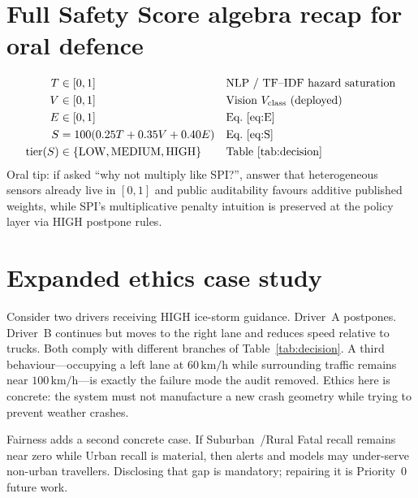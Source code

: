 \documentclass[11pt,a4paper]{article}
\begin{document}
\newpage
\section*{Full Safety Score algebra recap for oral defence}
\begin{align}
T &\in[0,1] && \text{NLP / TF--IDF hazard saturation}\\
V &\in[0,1] && \text{Vision $V_{\mathrm{class}}$ (deployed)}\\
E &\in[0,1] && \text{Eq.~\eqref{eq:E}}\\
S &=100(0.25T+0.35V+0.40E) && \text{Eq.~\eqref{eq:S}}\\
\mathrm{tier}(S) &\in\{\mathrm{LOW},\mathrm{MEDIUM},\mathrm{HIGH}\} && \text{Table~\ref{tab:decision}}
\end{align}
Oral tip: if asked ``why not multiply like SPI?'', answer that heterogeneous sensors already live in $[0,1]$ and public auditability favours additive published weights, while SPI's multiplicative penalty intuition is preserved at the policy layer via HIGH postpone rules.

\newpage
\section*{Expanded ethics case study}
\label{sec:ethicscase}
Consider two drivers receiving HIGH ice-storm guidance. Driver~A postpones. Driver~B continues but moves to the right lane and reduces speed relative to trucks. Both comply with different branches of Table~\ref{tab:decision}. A third behaviour---occupying a left lane at $60\,\mathrm{km/h}$ while surrounding traffic remains near $100\,\mathrm{km/h}$---is exactly the failure mode the audit removed. Ethics here is concrete: the system must not manufacture a new crash geometry while trying to prevent weather crashes.

Fairness adds a second concrete case. If Suburban~/Rural Fatal recall remains near zero while Urban recall is material, then alerts and models may under-serve non-urban travellers. Disclosing that gap is mandatory; repairing it is Priority~0 future work.

\newpage
\end{document}
